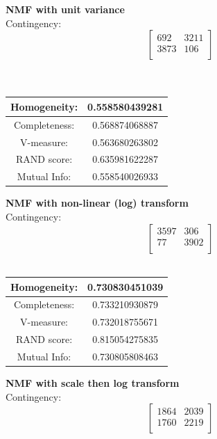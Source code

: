\documentclass{report}
\begin{document}
\textbf{NMF with unit variance} \\

Contingency:\[ 
\begin{bmatrix}
692 		& 3211 \\
3873  		& 106 \\
\end{bmatrix}
\]
\\ \\

\begin{center}
\begin{tabu}{| c | c |}
\hline
Homogeneity: 		& 0.558580439281 \\
\hline
Completeness: 		& 0.568874068887 \\
\hline
V-measure: 			& 0.563680263802 \\
\hline
RAND score: 		& 0.635981622287 \\
\hline
Mutual Info: 		& 0.558540026933 \\
\hline
\end{tabu}
\end{center}



\textbf{NMF with non-linear (log) transform} \\

Contingency: \[ 
\begin{bmatrix}
3597  		& 306 \\
77 			& 3902 \\
\end{bmatrix}
\]
\\

\begin{center}
\begin{tabu}{| c | c |}
\hline
Homogeneity: 		& 0.730830451039 \\
\hline
Completeness: 		& 0.733210930879 \\
\hline
V-measure: 			& 0.732018755671 \\
\hline
RAND score: 		& 0.815054275835 \\
\hline
Mutual Info: 		& 0.730805808463 \\
\hline
\end{tabu}
\end{center}


\textbf{NMF with scale then log transform} \\

Contingency:\[
\begin{bmatrix}
1864 		& 2039\\
1760 		& 2219 \\
\end{bmatrix}
\]
\\
\end{document}
